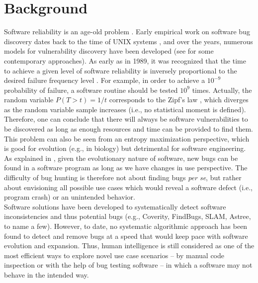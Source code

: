 \section{Background}
\label{sec:related}

Software reliability is an age-old problem \cite{littlewood1973bayesian,adams1984textordfeminineoptimizing,littlewood1989predicting}. Early empirical work on software bug discovery dates back to the time of UNIX systems \cite{miller1990empirical}, and over the years, numerous models for vulnerability discovery have been developed (see \cite{avgerinos2014enhancing,zhao2016empirical} for some contemporary approaches). As early as in 1989, it was recognized that the time to achieve a given level of software reliability is inversely proportional to the desired failure frequency level \cite{adams1984textordfeminineoptimizing}. For example, in order to achieve a $10^{-9}$ probability of failure, a software routine should be tested  $10^{9}$ times. Actually, the random variable $P(T > t) = 1/t$ corresponds to the Zipf's law \cite{maillart2008empirical,saichev2009theory}, which diverges as the random variable sample increases (i.e., no statistical moment is defined). Therefore, one can conclude that there will always be software vulnerabilities to be discovered as long as enough resources and time can be provided to find them. This problem can also be seen from an entropy maximization perspective, which is good for evolution (e.g., in biology) but detrimental for software engineering. As explained in \cite{brady1999murphy}, given the evolutionary nature of software, new bugs can be found in a software program as long as we have changes in use perspective. The difficulty of bug hunting is therefore not about finding bugs {\it per se}, but rather about envisioning all possible use cases which would reveal a software defect (i.e., program crash) or an unintended behavior.\\

Software solutions have been developed to systematically detect software inconsistencies and thus potential bugs (e.g., Coverity, FindBugs, SLAM, Astree, to name a few). However, to date, no systematic algorithmic approach has been found to detect and remove bugs at a speed that would keep pace with software evolution and expansion. Thus, human intelligence is still considered as one of the most efficient ways to explore novel use case scenarios -- by manual code inspection or with the help of bug testing software -- in which a software may not behave in the intended way.\\

